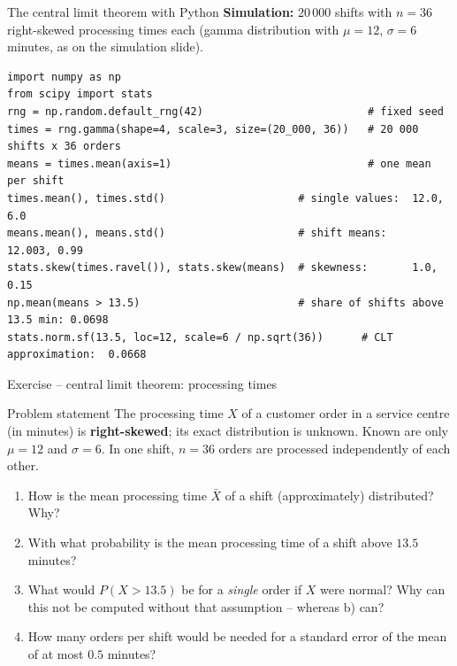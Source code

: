\documentclass[aspectratio=169,11pt]{beamer}
\begin{document}
\begin{frame}[fragile]{The central limit theorem with Python}
  \textbf{Simulation:} $20\,000$ shifts with $n=36$ right-skewed processing
  times each (gamma distribution with $\mu=12$, $\sigma=6$ minutes, as on the
  simulation slide).
\begin{lstlisting}
import numpy as np
from scipy import stats
rng = np.random.default_rng(42)                          # fixed seed
times = rng.gamma(shape=4, scale=3, size=(20_000, 36))   # 20 000 shifts x 36 orders
means = times.mean(axis=1)                               # one mean per shift
times.mean(), times.std()                     # single values:  12.0, 6.0
means.mean(), means.std()                     # shift means:    12.003, 0.99
stats.skew(times.ravel()), stats.skew(means)  # skewness:       1.0, 0.15
np.mean(means > 13.5)                         # share of shifts above 13.5 min: 0.0698
stats.norm.sf(13.5, loc=12, scale=6 / np.sqrt(36))      # CLT approximation:  0.0668
\end{lstlisting}
\end{frame}

\begin{frame}{Exercise -- central limit theorem: processing times}
  \begin{block}{Problem statement}
    The processing time $X$ of a customer order in a service centre (in
    minutes) is \textbf{right-skewed}; its exact distribution is unknown.
    Known are only $\mu=12$ and $\sigma=6$. In one shift, $n=36$ orders are
    processed independently of each other.
  \end{block}
  \begin{enumerate}\setlength{\itemsep}{3pt}
    \item[a)] How is the mean processing time $\bar X$ of a shift
              (approximately) distributed? Why?
    \item[b)] With what probability is the mean processing time of a shift
              above $13.5$ minutes?
    \item[c)] What would $P(X>13.5)$ be for a \emph{single} order if $X$ were
              normal? Why can this not be computed without that assumption --
              whereas b) can?
    \item[d)] How many orders per shift would be needed for a standard error of
              the mean of at most $0.5$ minutes?
  \end{enumerate}
\end{frame}
\end{document}
